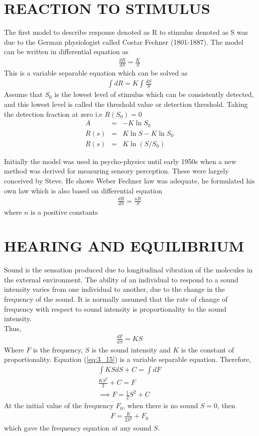 \documentclass[11pt]{report}
\newcommand{\sps}{\\[0.2cm]}
\newcommand{\refn}[1]{(\ref{#1})}
\newcommand{\refx}[1]{\refn{eq:#1}}
\newcommand{\NI}{\noindent}
\begin{document}
	\section{REACTION TO STIMULUS}
	The first model to describe response denoted as R to stimulus denoted as S was due to the German physiologist called Costar Fechner (1801-1887). The model can be written in differential equation as 
	\begin{eqnarray}
		\frac{dR}{dS} = \frac{K}{S}\label{eq:3_13}
	\end{eqnarray}
	This is a variable separable equation which can be solved as
	\begin{eqnarray*}
		\int dR = K\int\frac{dS}{S}
	\end{eqnarray*}
	Assume that $S_0$ is the lowest level of stimulus which can be consistently detected, and this lowest level is called the threshold value or detection threshold. Taking the detection fraction at zero i.e $R(S_0)=0$
	\begin{eqnarray*}
		A &=& -K\ln S_0\sps
		R(s) &=& K\ln S - K\ln S_0\sps
		R(s) &=& K\ln(S/S_0)
	\end{eqnarray*}
	
	\NI Initially the model was used in psycho-physics until early 1950s when a new method was derived for measuring sensory perception. These were largely conceived by Steve. He shows Weber Fechner law was adequate, he formulated his own law which is also based on differential equation
	\begin{eqnarray}
		\frac{dR}{dS} = \frac{nR}{S}
	\end{eqnarray}
	where $n$ is a positive constants
	
	\section{HEARING AND EQUILIBRIUM}
	Sound is the sensation produced due to longitudinal vibration of the molecules in the external environment. The ability of an individual to respond to a sound intensity varies from one individual to another, due to the change in the frequency of the sound. It is normally assumed that the rate of change of frequency with respect to sound intensity is proportionality to the sound intensity.\sps
	Thus,
	\begin{eqnarray}
		\frac{dF}{dS}=KS\label{eq:3_15}
	\end{eqnarray}
	Where $F$ is the frequency, $S$ is the sound intensity and $K$ is the constant of proportionality. Equation \refx{3_15} is a variable separable equation. Therefore,
	\begin{eqnarray*}
		\int KSdS + C = \int dF\sps
		\frac{KS^2}{2} + C = F\sps
		\implies F = \frac{1}{2}S^2 + C
	\end{eqnarray*}
	At the initial value of the frequency $F_0$, when there is no sound $S=0$, then
	\begin{eqnarray*}
		F = \frac{K}{2S^2} + F_0
	\end{eqnarray*}
	which gave the frequency equation at any sound $S$.
\end{document}
